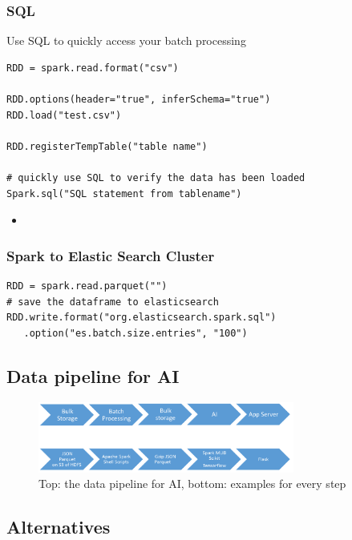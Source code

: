 \documentclass{article}
\begin{document}
\subsubsection{SQL}

Use SQL to quickly access your batch processing

\begin{verbatim}
RDD = spark.read.format("csv")

RDD.options(header="true", inferSchema="true")
RDD.load("test.csv")

RDD.registerTempTable("table name")

# quickly use SQL to verify the data has been loaded
Spark.sql("SQL statement from tablename")
\end{verbatim}


\begin{itemize}
    \item 
\end{itemize}

\subsubsection{Spark to Elastic Search Cluster}

\begin{verbatim}
RDD = spark.read.parquet("")
# save the dataframe to elasticsearch
RDD.write.format("org.elasticsearch.spark.sql")
   .option("es.batch.size.entries", "100")
\end{verbatim}

\subsection{Data pipeline for AI}

\begin{figure}[H]
    \centering
    \includegraphics[width=0.75\textwidth]{datapipeline-ai.png}
    \caption{Top: the data pipeline for AI, bottom: examples for every step}
\end{figure}

\subsection{Alternatives}
\end{document}
